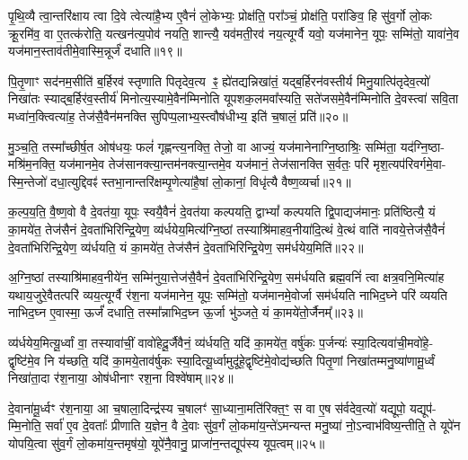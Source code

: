 {\anuvakamend[{जु॒षे॒ सते॑जस॒मन॑क्षसङ्गं बहुशा॒खं वृ॑श्चेदे॒ष वै य॒ज्ञ उपै॑न॒मुत्त॑रो य॒ज्ञ आप्त्या॒ एका॒न्नविꣳ॑श॒तिश्च॑॥३॥}]}

पृ॒थि॒व्यै त्वा॒न्तरि॑क्षाय त्वा दि॒वे त्वेत्या॑है॒भ्य ए॒वैनं॑ लो॒केभ्यः॒ प्रोक्ष॑ति॒ परा᳚ञ्चं॒ प्रोक्ष॑ति॒ परा॑ङिव॒ हि सु॑व॒र्गो लो॒कः क्रू॒रमि॑व॒ वा ए॒तत्क॑रोति॒ यत्खन॑त्य॒पोव॑ नयति॒ शान्त्यै॒ यव॑मती॒रव॑ नय॒त्यूर्ग्वै यवो॒ यज॑मानेन॒ यूपः॒ सम्मि॑तो॒ यावा॑ने॒व यज॑मान॒स्ताव॑तीमे॒वास्मि॒न्नूर्जं॑ दधाति॥१९॥

पि॒तृ॒णाꣳ सद॑नम॒सीति॑ ब॒र्\mbox{}हिरव॑ स्तृणाति पितृदेव॒त्य ꣴ॒ ह्ये॑तद्यन्निखा॑तं॒ यद्ब॒र्\mbox{}हिरन॑वस्तीर्य मिनु॒यात्पि॑तृदेव॒त्यो॑ निखा॑तः स्याद्ब॒र्\mbox{}हिर॑व॒स्तीर्य॑ मिनोत्य॒स्यामे॒वैन॑म्मिनोति यूपशक॒लमवा᳚स्यति॒ सते॑जसमे॒वैन॑म्मिनोति दे॒वस्त्वा॑ सवि॒ता मध्वा॑न॒क्त्वित्या॑ह॒ तेज॑सै॒वैन॑मनक्ति सुपिप्प॒लाभ्य॒स्त्वौष॑धीभ्य॒ इति॑ च॒षालं॒ प्रति॑॥२०॥

मु॒ञ्च॒ति॒ तस्मा᳚च्छीर्\mbox{}ष॒त ओष॑धयः॒ फलं॑ गृह्णन्त्य॒नक्ति॒ तेजो॒ वा आज्यं॒ यज॑मानेनाग्नि॒ष्ठाश्रिः॒ सम्मि॑ता॒ यद॑ग्नि॒ष्ठा- मश्रि॑म॒नक्ति॒ यज॑मानमे॒व तेज॑सानक्त्या॒न्तम॑नक्त्या॒न्तमे॒व यज॑मानं॒ तेज॑सानक्ति स॒र्वतः॒ परि॑ मृश॒त्यप॑रिवर्गमे॒वा- स्मि॒न्तेजो॑ दधा॒त्युद्दिवꣴ॑ स्तभा॒नान्तरि॑क्षम्पृ॒णेत्या॑है॒षां लो॒कानां॒ विधृ॑त्यै वैष्ण॒व्यर्चा॥२१॥

क॒ल्प॒य॒ति॒ वै॒ष्ण॒वो वै दे॒वत॑या॒ यूपः॒ स्वयै॒वैनं॑ दे॒वत॑या कल्पयति॒ द्वा\-भ्यां᳚ कल्पयति द्वि॒पाद्यज॑मानः॒ प्रति॑ष्ठित्यै॒ यं का॒मये॑त॒ तेज॑सैनं दे॒वता॑भिरिन्द्रि॒येण॒ व्य॑र्धयेय॒मित्य॑ग्नि॒ष्ठां तस्याश्रि॑माहव॒नीया॑दि॒त्थं वे॒त्थं वाति॑ नावये॒त्तेज॑सै॒वैनं॑ दे॒वता॑भिरिन्द्रि॒येण॒ व्य॑र्धयति॒ यं का॒मये॑त॒ तेज॑सैनं दे॒वता॑भिरिन्द्रि॒येण॒ सम॑र्धयेय॒मिति॑॥२२॥

अ॒ग्नि॒ष्ठां तस्याश्रि॑माहव॒नीये॑न॒ सम्मि॑नुया॒त्तेज॑सै॒वैनं॑ दे॒वता॑भिरिन्द्रि॒येण॒ सम॑र्धयति ब्रह्म॒वनिं॑ त्वा क्षत्र॒वनि॒मित्या॑ह यथाय॒जुरे॒वैतत्परि॑ व्यय॒त्यूर्ग्वै र॑श॒ना यज॑मानेन॒ यूपः॒ सम्मि॑तो॒ यज॑मानमे॒वोर्जा सम॑र्धयति नाभिद॒घ्ने परि॑ व्ययति नाभिद॒घ्न ए॒वास्मा॒ ऊर्जं॑ दधाति॒ तस्मा᳚न्नाभिद॒घ्न ऊ॒र्जा भु॑ञ्जते॒ यं का॒मये॑तो॒र्जैनम्᳚॥२३॥

व्य॑र्धयेय॒मित्यू॒र्ध्वां वा॒ तस्यावा॑चीं॒ वावो॑हेदू॒र्जैवैनं॒ व्य॑र्धयति॒ यदि॑ का॒मये॑त॒ वर्\mbox{}षु॑कः प॒र्जन्यः॑ स्या॒दित्यवा॑ची॒मवो॑हे॒- द्वृष्टि॑मे॒व नि य॑च्छति॒ यदि॑ का॒मये॒ताव॑र्\mbox{}षुकः स्या॒दित्यू॒र्ध्वामुदू॑हे॒द्वृष्टि॑मे॒वोद्य॑च्छति पितृ॒णां निखा॑तम्मनु॒ष्या॑णामू॒र्ध्वं निखा॑ता॒दा र॑श॒नाया॒ ओष॑धीनाꣳ रश॒ना विश्वे॑षाम्॥२४॥

दे॒वाना॑मू॒र्ध्वꣳ र॑श॒नाया॒ आ च॒षाला॒दिन्द्र॑स्य च॒षालꣳ॑ सा॒ध्याना॒मति॑रिक्त॒ꣳ॒ स वा ए॒ष स॑र्वदेव॒त्यो॑ यद्यूपो॒ यद्यूप॑- म्मि॒नोति॒ सर्वा॑ ए॒व दे॒वताः᳚ प्रीणाति य॒ज्ञेन॒ वै दे॒वाः सु॑व॒र्गं लो॒कमा॑य॒न्ते॑\-ऽमन्यन्त मनु॒ष्या॑ नो॒\-ऽन्वाभ॑विष्य॒न्तीति॒ ते यूपे॑न योपयि॒त्वा सु॑व॒र्गं लो॒कमा॑य॒न्तमृष॑यो॒ यूपे॑नै॒वानु॒ प्राजा॑न॒न्तद्यूप॑स्य यूप॒त्वम्॥२५॥

